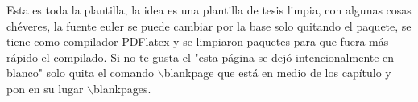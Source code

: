 \thispagestyle{empty}
\vspace{-0.7cm}


Esta es toda la plantilla, la idea es una plantilla de  tesis limpia, con algunas cosas chéveres, la fuente euler se puede cambiar por la base solo quitando el paquete, se tiene como compilador PDFlatex  y se limpiaron paquetes para que fuera más rápido el compilado. Si no te gusta el "esta página se dejó intencionalmente en blanco" solo quita el comando $\backslash$blankpage que está en medio de los capítulo y pon en su lugar $\backslash$blankpages.
